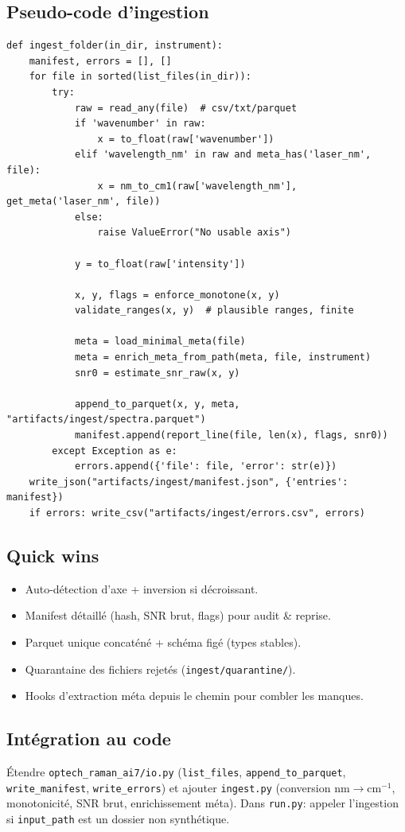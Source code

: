\subsection{Pseudo-code d'ingestion}
\begin{lstlisting}[basicstyle=\ttfamily\small]
def ingest_folder(in_dir, instrument):
    manifest, errors = [], []
    for file in sorted(list_files(in_dir)):
        try:
            raw = read_any(file)  # csv/txt/parquet
            if 'wavenumber' in raw:
                x = to_float(raw['wavenumber'])
            elif 'wavelength_nm' in raw and meta_has('laser_nm', file):
                x = nm_to_cm1(raw['wavelength_nm'], get_meta('laser_nm', file))
            else:
                raise ValueError("No usable axis")

            y = to_float(raw['intensity'])

            x, y, flags = enforce_monotone(x, y)
            validate_ranges(x, y)  # plausible ranges, finite

            meta = load_minimal_meta(file)
            meta = enrich_meta_from_path(meta, file, instrument)
            snr0 = estimate_snr_raw(x, y)

            append_to_parquet(x, y, meta, "artifacts/ingest/spectra.parquet")
            manifest.append(report_line(file, len(x), flags, snr0))
        except Exception as e:
            errors.append({'file': file, 'error': str(e)})
    write_json("artifacts/ingest/manifest.json", {'entries': manifest})
    if errors: write_csv("artifacts/ingest/errors.csv", errors)
\end{lstlisting}

\subsection{Quick wins}
\begin{itemize}[nosep]
\item Auto-détection d'axe + inversion si décroissant.
\item Manifest détaillé (hash, SNR brut, flags) pour audit \& reprise.
\item Parquet unique concaténé + schéma figé (types stables).
\item Quarantaine des fichiers rejetés (\texttt{ingest/quarantine/}).
\item Hooks d'extraction méta depuis le chemin pour combler les manques.
\end{itemize}

\subsection{Intégration au code}
Étendre \texttt{optech\_raman\_ai7/io.py} (\texttt{list\_files}, \texttt{append\_to\_parquet}, \texttt{write\_manifest}, \texttt{write\_errors}) et ajouter \texttt{ingest.py} (conversion nm$\rightarrow$cm$^{-1}$, monotonicité, SNR brut, enrichissement méta). Dans \texttt{run.py}: appeler l'ingestion si \texttt{input\_path} est un dossier non synthétique.

